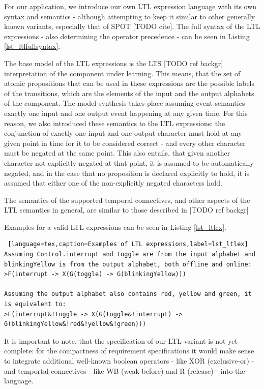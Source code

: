 For our application, we introduce our own LTL expression language with its own syntax and semantics - although attempting to keep it similar to other generally known variants, especially that of SPOT [TODO cite]. The full syntax of the LTL expressions - also determining the operator precedence - can be seen in Listing \ref{lst_ltlfullsyntax}.

The base model of the LTL expressions is the LTS [TODO ref backgr] interpretation of the component under learning. This means, that the set of atomic propositions that can be used in these expressions are the possible labels of the transitions, which are the elements of the input and the output alphabets of the component. The model synthesis takes place assuming event semantics - exactly one input and one output event happening at any given time. For this reason, we also introduced these semantics to the LTL expressions: the conjunction of exactly one input and one output character must hold at any given point in time for it to be considered correct - and every other character must be negated at the same point. This also entails, that given another character not explicitly negated at that point, it is assumed to be automatically negated, and in the case that no proposition is declared explicitly to hold, it is assumed that either one of the non-explicitly negated characters hold. 

The semantics of the supported temporal connectives, and other aspects of the LTL semantics in general, are similar to those described in [TODO ref backgr] %

Examples for a valid LTL expressions can be seen in Listing \ref{lst_ltlex}.

\bigskip
\begin{lstlisting} [language=tex,caption=Examples of LTL expressions,label=lst_ltlex]
Assuming Control.interrupt and toggle are from the input alphabet and blinkingYellow is from the output alphabet, both offline and online:
>F(interrupt -> X(G(toggle) -> G(blinkingYellow)))

Assuming the output alphabet also contains red, yellow and green, it is equivalent to:
>F(interrupt&!toggle -> X(G(toggle&!interrupt) -> G(blinkingYellow&!red&!yellow&!green)))
\end{lstlisting}

It is important to note, that the specification of our LTL variant is not yet complete: for the compactness of requirement specifications it would make sense to integrate additional well-known boolean operators - like XOR (exclusive-or) - and temportal connectives - like WB (weak-before) and R (release) - into the language. 

